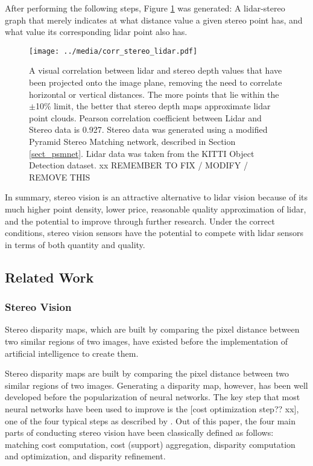After performing the following steps, Figure \ref{corr_stereo_lidar} was generated: A lidar-stereo graph that merely indicates at what distance value a given stereo point has, and what value its corresponding lidar point also has.

\begin{figure}[ht]
	\centering
	\texttt{[image: ../media/corr\_stereo\_lidar.pdf]}
	\caption{A visual correlation between lidar and stereo depth values that have been projected onto the image plane, removing the need to correlate horizontal or vertical distances. The more points that lie within the $\pm$10\% limit, the better that stereo depth maps approximate lidar point clouds. Pearson correlation coefficient between Lidar and Stereo data is 0.927. Stereo data was generated using a modified Pyramid Stereo Matching network, described in Section \ref{sect_psmnet}. Lidar data was taken from the KITTI Object Detection dataset. xx REMEMBER TO FIX / MODIFY / REMOVE THIS}
	\label{corr_stereo_lidar}
\end{figure}

In summary, stereo vision is an attractive alternative to lidar vision because of its much higher point density, lower price, reasonable quality approximation of lidar, and the potential to improve through further research. Under the correct conditions, stereo vision sensors have the potential to compete with lidar sensors in terms of both quantity and quality.




\newpage
\subsection{Related Work} %

\subsubsection{Stereo Vision}
Stereo disparity maps, which are built by comparing the pixel distance between two similar regions of two images, have existed before the implementation of artificial intelligence to create them. 

Stereo disparity maps are built by comparing the pixel distance between two similar regions of two images. Generating a disparity map, however, has been well developed before the popularization of neural networks. The key step that most neural networks have been used to improve is the [cost optimization step?? xx], one of the four typical steps as described by \cite{scharstein_taxonomy_2002}. Out of this paper, the four main parts of conducting stereo vision have been classically defined as follows: matching cost computation, cost (support) aggregation, disparity computation and optimization, and disparity refinement.

